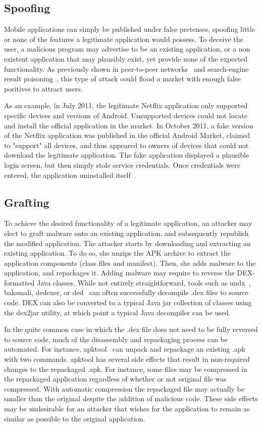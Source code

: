 \subsection{Spoofing}
\label{Spoofing}
Mobile applications can simply be published under false pretenses, spoofing little or none of the features a legitimate application would possess. To deceive the user, a malicious program may advertise to be an existing application, or a non existent application that may plausibly exist, yet provide none of the expected functionality. As previously shown in peer-to-peer networks~\cite{58} and search-engine result poisoning~\cite{59,60}, this type of attack could flood a market with enough false positives to attract
users.

As an example, in July 2011, the legitimate Netflix application only supported specific devices and versions of Android. Unsupported devices could not locate and install the official application in the market. In October 2011, a fake version of the Netflix application was published in the official Android Market, claimed to "support" all devices, and thus appeared to owners of devices that could not download the legitimate application. The fake application displayed a plausible login screen, but then simply stole service credentials. Once credentials were entered, the application uninstalled itself~\cite{60}.

\subsection{Grafting}
\label{Grafting}
To achieve the desired functionality of a legitimate application, an attacker may elect to graft malware onto an existing
application, and subsequently republish the modified application. The attacker starts by downloading and extracting an existing
application. To do so, she unzips the APK archive to extract the application components (class files and manifest). Then, she adds malware to the application, and repackages it. Adding malware may require to reverse the DEX-formatted Java classes. While not entirely straightforward, tools such as undx~\cite{62}, baksmali, dedexer, or ded~\cite{63} can often successfully decompile .dex files to source code. DEX can also be converted to a typical Java jar collection of classes using the dex2jar utility,
at which point a typical Java decompiler can be used.

In the quite common case in which the .dex file does not need to be fully reversed to source code, much of the disassembly and
repackaging process can be automated. For instance, apktool~\cite{28} can unpack and repackage an existing .apk with two commands.
apktool has several side effects that result in non-required changes to the repackaged .apk. For instance, some files may be compressed in the repackaged application regardless of whether or not original file was compressed. With automatic compression the repackaged file may actually be smaller than the original despite the addition of malicious code. These side effects may be undesirable for an attacker that wishes for the application to remain as similar as possible to the original application.

